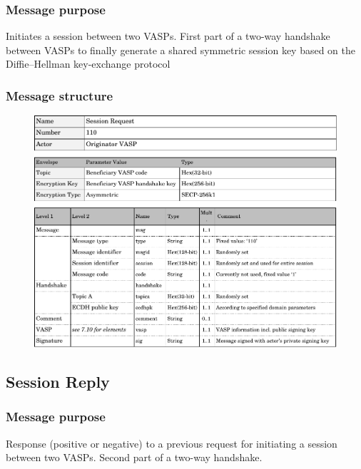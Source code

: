 \documentclass{article}
\begin{document}
\subsubsection{Message purpose}
Initiates a session between two VASPs. First part of a two-way handshake between VASPs to finally generate a shared symmetric session key based on the Diffie–Hellman key-exchange protocol

\subsubsection{Message structure}
\begin{figure}[h]
    \centering
    \includegraphics[width=\textwidth]{g20.pdf}
\end{figure}
\newpage



\subsection{Session Reply}
\subsubsection{Message purpose}
Response (positive or negative) to a previous request for initiating a session between two VASPs. Second part of a two-way handshake.
\end{document}
